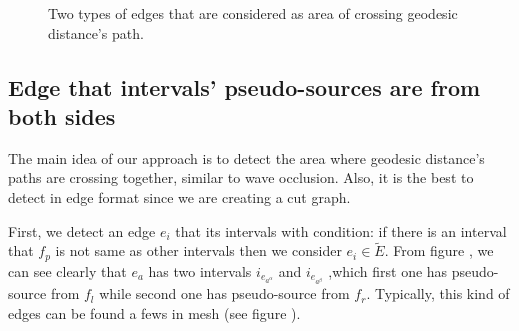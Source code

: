 \documentclass[a4paper,twoside]{article}
\begin{document}
\begin{figure}[h!]
	\centering		
	\hspace{10pt}
	\hspace{0.00\columnwidth}
	\caption[]{Two types of edges that are considered as area of crossing geodesic distance's path.}
	\label{fig:fig-two-type-edges}
\end{figure}


\subsection{Edge that intervals' pseudo-sources are from both sides}
\label{subsec:pseudo-sources laid on both side of adjacent faces}
The main idea of our approach is to detect the area where geodesic distance's paths are crossing together, similar to wave occlusion. Also, it is the best to detect in edge format since we are creating a cut graph.

First, we detect an edge $e_i$ that its intervals with condition: if there is an interval that $f_p$ is not same as other intervals then we consider $e_i \in \tilde{E}$. From figure , we can see clearly that $e_a$ has two intervals $i_{e_{a^\alpha}}$ and $i_{e_{a^\beta}}$ ,which first one has pseudo-source from $f_l$ while second one has pseudo-source from $f_r$. Typically, this kind of edges can be found a fews in mesh (see figure ). 
\end{document}
